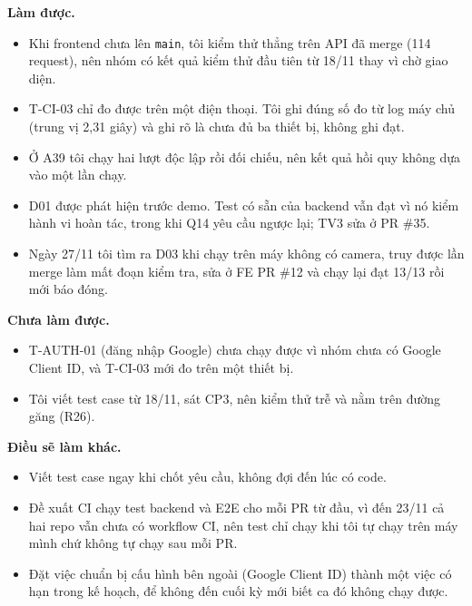 \textbf{Làm được.}
\begin{itemize}
  \item Khi frontend chưa lên \texttt{main}, tôi kiểm thử thẳng trên API đã merge (114 request), nên nhóm có kết quả kiểm thử đầu tiên từ 18/11 thay vì chờ giao diện.
  \item T-CI-03 chỉ đo được trên một điện thoại. Tôi ghi đúng số đo từ log máy chủ (trung vị 2,31 giây) và ghi rõ là chưa đủ ba thiết bị, không ghi đạt.
  \item Ở A39 tôi chạy hai lượt độc lập rồi đối chiếu, nên kết quả hồi quy không dựa vào một lần chạy.
  \item D01 được phát hiện trước demo. Test có sẵn của backend vẫn đạt vì nó kiểm hành vi hoàn tác, trong khi Q14 yêu cầu ngược lại; TV3 sửa ở PR \#35.
  \item Ngày 27/11 tôi tìm ra D03 khi chạy trên máy không có camera, truy được lần merge làm mất đoạn kiểm tra, sửa ở FE PR \#12 và chạy lại đạt 13/13 rồi mới báo đóng.
\end{itemize}

\textbf{Chưa làm được.}
\begin{itemize}
  \item T-AUTH-01 (đăng nhập Google) chưa chạy được vì nhóm chưa có Google Client ID, và T-CI-03 mới đo trên một thiết bị.
  \item Tôi viết test case từ 18/11, sát CP3, nên kiểm thử trễ và nằm trên đường găng (R26).
\end{itemize}

\textbf{Điều sẽ làm khác.}
\begin{itemize}
  \item Viết test case ngay khi chốt yêu cầu, không đợi đến lúc có code.
  \item Đề xuất CI chạy test backend và E2E cho mỗi PR từ đầu, vì đến 23/11 cả hai repo vẫn chưa có workflow CI, nên test chỉ chạy khi tôi tự chạy trên máy mình chứ không tự chạy sau mỗi PR.
  \item Đặt việc chuẩn bị cấu hình bên ngoài (Google Client ID) thành một việc có hạn trong kế hoạch, để không đến cuối kỳ mới biết ca đó không chạy được.
\end{itemize}

